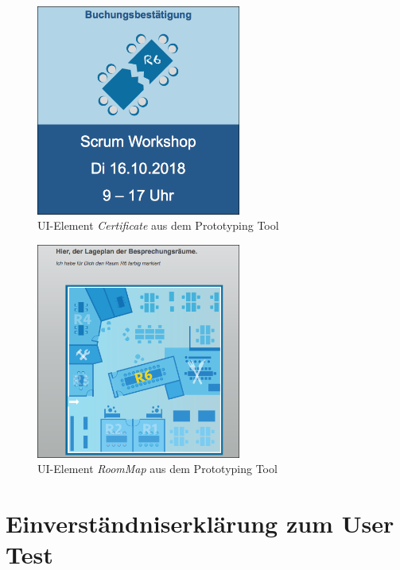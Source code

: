 \begin{figure}[!htb]
    \centering
    \includegraphics[width=0.6\textwidth]{bilder/anhang/UIElementsPrototyping/Certificate.png}
    \caption{\acs{UI}-Element \textit{Certificate} aus dem Prototyping Tool}
    \label{fig:ui-element-certificate}
\end{figure}

\begin{figure}[!htb]
    \centering
    \includegraphics[width=0.6\textwidth]{bilder/anhang/UIElementsPrototyping/RoomMap.png}
    \caption{\acs{UI}-Element \textit{RoomMap} aus dem Prototyping Tool}
    \label{fig:ui-element-roommap}
\end{figure}

\section{Einverständniserklärung zum User Test}
\label{sec:anhang-einverstaendnis-user-test}

